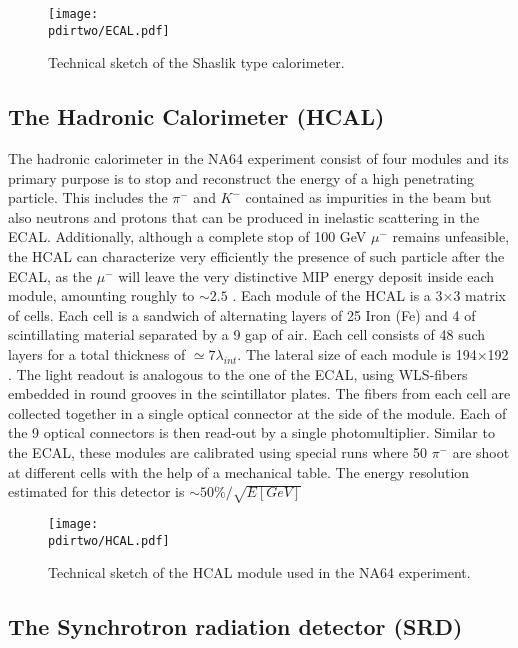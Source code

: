 \begin{figure}[bth!]
\centering
\texttt{[image: \\pdirtwo/ECAL.pdf]}
\caption[ECAL sketch]{Technical sketch of the Shaslik type calorimeter.}
\label{fig:ecal-sketch}
\end{figure}

\subsection{The Hadronic Calorimeter (HCAL)}
\label{ch2:sec:detectors-hcal}

The hadronic calorimeter in the NA64 experiment consist of four modules and its primary purpose is to stop and reconstruct the energy of a high penetrating particle. This includes the $\pi^-$ and $K^-$ contained as impurities in the beam but also neutrons and protons that can be produced in inelastic scattering in the ECAL. Additionally, although a complete stop of 100 GeV $\mu^-$ remains unfeasible, the HCAL can characterize very efficiently the presence of such particle after the ECAL, as the $\mu^-$ will leave the very distinctive MIP energy deposit inside each module, amounting roughly to $\sim 2.5$ \gev. Each module of the HCAL is a 3$\times$3 matrix of cells. Each cell is a sandwich of alternating layers of 25 \mmi Iron (Fe) and 4 \mmi of scintillating material separated by a 9 \mmi gap of air. Each cell consists of 48 such layers for a total thickness of $\simeq 7\lambda_{int}$. The lateral size of each module is 194$\times$192 \mms. The light readout is analogous to the one of the ECAL, using WLS-fibers embedded in round grooves in the scintillator plates. The fibers from each cell are collected together in a single optical connector at the side of the module. Each of the 9 optical connectors is then read-out by a single photomultiplier. Similar to the ECAL, these modules are calibrated using special runs where 50 \gev $\pi^-$ are shoot at different cells with the help of a mechanical table. The energy resolution estimated for this detector is $\sim 50\%/\sqrt{E[GeV]}$

\begin{figure}[bth!]
\centering
\texttt{[image: \\pdirtwo/HCAL.pdf]}
\caption[HCAL sketch]{Technical sketch of the HCAL module used in the NA64 experiment.}
\label{fig:hcal-sketch}
\end{figure}

\subsection{The Synchrotron radiation detector (SRD)}
\label{ch2:sec:detectors-srd}

